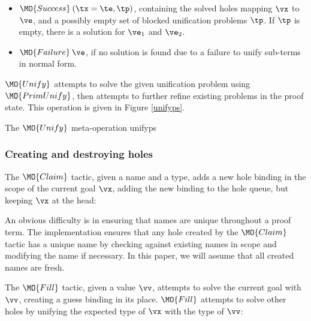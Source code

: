 \begin{itemize}
\item $\MO{Success}\:(\tx=\te, \tp)$, containing the solved holes mapping
$\vx$ to $\ve$, and a possibly empty set of blocked unification problems $\tp$.
If $\tp$ is empty, there is a solution for $\ve_1$ and $\ve_2$. 
\item $\MO{Failure}\:\ve$, if no solution is found due to a failure to unify
sub-terms in normal form.
\end{itemize}

$\MO{Unify}$ attempts to solve the given unification problem using
$\MO{PrimUnify}$, then attempts to further refine existing problems in the proof
state. This operation is given in Figure \ref{unifyps}. 

{The $\MO{Unify}$ meta-operation}
{unifyps}


\subsubsection{Creating and destroying holes}

The $\MO{Claim}$ tactic, given a name and a type, adds a new hole binding in
the scope of the current goal $\vx$, adding the new binding to the hole queue, but
keeping $\vx$ at the head:


An obvious difficulty is in ensuring that names are unique throughout a proof term.
The implementation ensures that any hole created by the $\MO{Claim}$ tactic
has a unique name by checking against existing names in scope and modifying
the name if necessary. In this paper, we will assume that all created names are fresh.

The $\MO{Fill}$ tactic, given a value $\vv$, attempts to solve the current goal
with $\vv$, creating a guess binding in its place. $\MO{Fill}$ attempts to
solve other holes by unifying the expected type of $\vx$ with the type of $\vv$:


